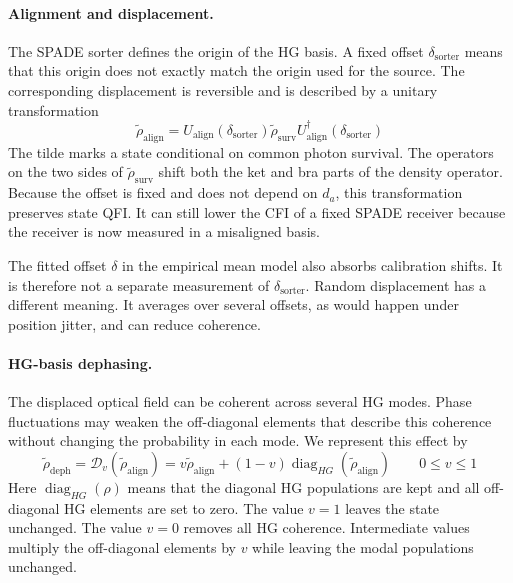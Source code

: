 \paragraph{Alignment and displacement.}
The SPADE sorter defines the origin of the HG basis.  A fixed offset $\delta_{\mathrm{sorter}}$ means that this origin does not exactly match the origin used for the source.  The corresponding displacement is reversible and is described by a unitary transformation
\begin{equation}
    \widetilde{\rho}_{\mathrm{align}}
    =U_{\mathrm{align}}(\delta_{\mathrm{sorter}})
    \widetilde{\rho}_{\mathrm{surv}}
    U_{\mathrm{align}}^{\dagger}(\delta_{\mathrm{sorter}})
    \label{eq:spade_alignment_channel}
\end{equation}
The tilde marks a state conditional on common photon survival. The operators on the two sides of $\widetilde{\rho}_{\mathrm{surv}}$ shift both the ket and bra parts of the density operator.  Because the offset is fixed and does not depend on $d_a$, this transformation preserves state QFI.  It can still lower the CFI of a fixed SPADE receiver because the receiver is now measured in a misaligned basis.

The fitted offset $\delta$ in the empirical mean model also absorbs calibration shifts.  It is therefore not a separate measurement of $\delta_{\mathrm{sorter}}$.  Random displacement has a different meaning.  It averages over several offsets, as would happen under position jitter, and can reduce coherence.

\paragraph{HG-basis dephasing.}
The displaced optical field can be coherent across several HG modes.  Phase fluctuations may weaken the off-diagonal elements that describe this coherence without changing the probability in each mode.  We represent this effect by
\begin{equation}
    \widetilde{\rho}_{\mathrm{deph}}
    =\mathcal{D}_{v}(\widetilde{\rho}_{\mathrm{align}})
    =v\widetilde{\rho}_{\mathrm{align}}+(1-v)\operatorname{diag}_{HG}(\widetilde{\rho}_{\mathrm{align}})
    \qquad 0\leq v\leq1
    \label{eq:spade_quantum_sequence}
\end{equation}
Here $\operatorname{diag}_{HG}(\rho)$ means that the diagonal HG populations are kept and all off-diagonal HG elements are set to zero.  The value $v=1$ leaves the state unchanged.  The value $v=0$ removes all HG coherence.  Intermediate values multiply the off-diagonal elements by $v$ while leaving the modal populations unchanged.

